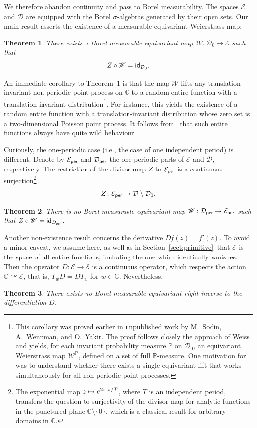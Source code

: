 \documentclass[11pt]{paper}
\newtheorem{theorem}{Theorem}
\newcommand{\bC}{\mathbb C}
\newcommand{\bP}{\mathbb P}
\newcommand{\cE}{\mathcal E}
\newcommand{\cD}{\mathcal D}
\newcommand{\sW}{\mathscr W}
\begin{document}
We therefore abandon continuity and pass to Borel measurability. The spaces $\cE$ and $\cD$ are
equipped with the Borel $\sigma$-algebras generated by their open sets. Our main result asserts the
existence of a measurable equivariant Weierstrass map:
\begin{theorem}\label{thm:main}
There exists a Borel measurable equivariant map
$\sW\colon \cD_0 \to \cE$ such that \[ Z \circ \sW = {\sf id}_{\cD_0}.\]
\end{theorem}
An immediate corollary to Theorem~\ref{thm:main} is that the map $\sW$ lifts any
translation-invariant non-periodic point process on $\bC$ to a random entire function with a
translation-invariant distribution\footnote{ This corollary was proved earlier in unpublished work
  by M.~Sodin, A.~Wennman, and O.~Yakir.  The proof follows closely the approach of
  Weiss~\cite{Weiss} and yields, for each invariant probability measure $\bP$ on $\cD_0$, an
  equivariant Weierstrass map $\mathscr{W}^{\bP}$, defined on a set of full $\bP$-measure. One
  motivation for~\cite{SSW} was to understand whether there exists a single equivariant lift that
  works simultaneously for all non-periodic point processes.  }.  For instance, this yields the
existence of a random entire function with a translation-invariant distribution whose zero set is a
two-dimensional Poisson point process. It follows from~\cite{BGLS} that such entire functions always
have quite wild behaviour.


Curiously, the one-periodic case (i.e., the case of one independent period) is different.  Denote by
$\cE_{\sf per}$ and $\cD_{\sf per}$ the one-periodic parts of $\cE$ and $\cD$, respectively.  The
restriction of the divisor map $Z$ to $\cE_{\sf per}$ is a continuous surjection\footnote{The
  exponential map $z\mapsto e^{2\pi {\rm i}z/T}$, where $T$ is an independent period, transfers the
  question to surjectivity of the divisor map for analytic functions in the punctured plane
  $\bC\setminus\{0\}$, which is a classical result for arbitrary domains in $\bC$.  }
\[ Z\colon \cE_{\sf per}\to\cD\setminus \cD_0. \]
\begin{theorem}\label{thm:1-periodic}
There is no Borel measurable equivariant map $\sW\colon \cD_{\sf per}\to \cE_{\sf per}$ such that
$Z\circ \sW = {\sf id}_{\cD_{\sf per}}$.
\end{theorem}

Another non-existence result concerns the derivative $Df(z)=f'(z)$. To avoid a minor caveat, we
assume here, as well as in Section~\ref{sect:primitive}, that $\cE$ is the space of all entire
functions, including the one which identically vanishes.  Then the operator $D\colon \cE\to \cE$ is
a continuous operator, which respects the action $\bC \curvearrowright\cE$, that is, $T_w D = D T_w$
for $w\in \bC$. Nevertheless,
\begin{theorem}\label{thm:primitive}
There exists no Borel measurable equivariant right inverse to the differentiation $D$.
\end{theorem}
\end{document}
